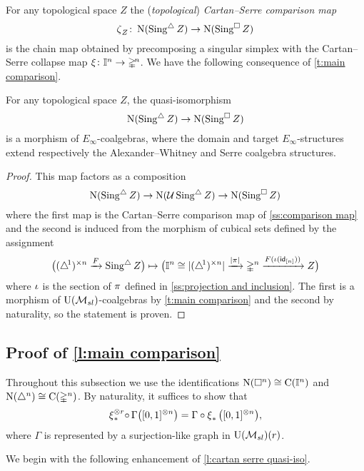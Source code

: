 For any topological space $Z$ the (\textit{topological}) \textit{Cartan--Serre comparison map}
\[
\operatorname{\zeta}_Z \colon \operatorname{N}(\operatorname{Sing^{\triangle}} Z) \to \operatorname{N}(\operatorname{Sing^{\square}} Z)
\]
is the chain map obtained by precomposing a singular simplex with the Cartan--Serre collapse map $\operatorname{\xi} \colon \mathbb{I}^n \to \mathbb{\Delta}^{\!n}$.
We have the following consequence of \cref{t:main comparison}.

\begin{corollary} \label{t:topological comparison}
	For any topological space $Z$, the quasi-isomorphism
	\[
	\operatorname{N}(\operatorname{Sing^{\triangle}} Z) \to \operatorname{N}(\operatorname{Sing^{\square}} Z)
	\]
	is a morphism of $E_\infty$-coalgebras, where the domain and target $E_\infty$-structures extend respectively the Alexander--Whitney and Serre coalgebra structures.
\end{corollary}

\begin{proof}
	This map factors as a composition
	\[
	\operatorname{N}(\operatorname{Sing^{\triangle}} Z) \to \operatorname{N}(\operatorname{\mathcal{U}} \operatorname{Sing^{\triangle}} Z) \to \operatorname{N}(\operatorname{Sing^{\square}} Z)
	\]
	where the first map is the Cartan--Serre comparison map of \cref{ss:comparison map} and the second is induced from the morphism of cubical sets defined by the assignment
	\[
	\big( (\triangle^{\!1})^{\times n} \xrightarrow{F} \operatorname{Sing^{\triangle}} Z \big) \mapsto
	\big( \mathbb{I}^n \cong \lvert(\triangle^{\!1})^{\times n}\rvert \xrightarrow{\lvert\operatorname{\pi}\rvert} \mathbb{\Delta}^n \xrightarrow{F(\operatorname{\iota}(\mathsf{id}_{[n]}))} Z \big)
	\]
	where $\operatorname{\iota}$ is the section of $\operatorname{\pi}$ defined in \cref{ss:projection and inclusion}.
	The first is a morphism of ${\operatorname{U}(\mathcal{M}_{sl})}$-coalgebras by \cref{t:main comparison} and the second by naturality, so the statement is proven.
\end{proof}


\subsection{Proof of \cref{l:main comparison}} \label{ss:comparison proof}

Throughout this subsection we use the identifications $\operatorname{N}(\square^n) \cong \operatorname{C}(\mathbb{I}^n)$ and $\operatorname{N}(\triangle^n) \cong \operatorname{C}(\mathbb{\Delta}^n)$.
By naturality, it suffices to show that
\begin{equation} \label{e:Cartan--Serre E-coalgebra map}
\operatorname{\xi}_\ast^{\otimes r} \! \circ \, \Gamma \big( [0,1]^{\otimes n} \big) =
\Gamma \circ \operatorname{\xi}_\ast \big( [0,1]^{\otimes n} \big),
\end{equation}
where $\Gamma$ is represented by a surjection-like graph in ${\operatorname{U}(\mathcal{M}_{sl})}(r)$.

We begin with the following enhancement of \cref{l:cartan serre quasi-iso}.

